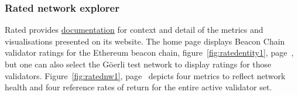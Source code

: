 \documentclass[UTF8]{article}
\begin{document}
{\subsubsection*{Rated network explorer}
Rated provides \href{https://docs.rated.network}{documentation} for context and detail of the metrics and visualisations presented on its website.
	 The home page displays Beacon Chain validator ratings for the Ethereum beacon chain, figure~\ref{fig:ratedentity1}, page~\pageref{fig:ratedentity1}, but one can also select the G\"oerli test network to display ratings for those validators.
Figure~\ref{fig:ratednw1}, page~\pageref{fig:ratednw1} depicts four metrics to reflect network health and four reference rates of return for the entire active validator set.


}
\end{document}
